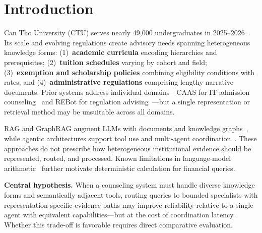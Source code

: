 \section{Introduction}
\label{sec:intro}

Can Tho University (CTU) serves nearly 49,000 undergraduates in 2025--2026~\cite{ctu2025opening}. Its scale and evolving regulations create advisory needs spanning heterogeneous knowledge forms: (1)~\textbf{academic curricula} encoding hierarchies and prerequisites; (2)~\textbf{tuition schedules} varying by cohort and field; (3)~\textbf{exemption and scholarship policies} combining eligibility conditions with rates; and (4)~\textbf{administrative regulations} comprising lengthy narrative documents. Prior systems address individual domains---CAAS for IT admission counseling~\cite{ma2023caas} and REBot for regulation advising~\cite{ma2025rebot}---but a single representation or retrieval method may be unsuitable across all domains.

RAG and GraphRAG augment LLMs with documents and knowledge graphs~\cite{lewis2020rag,gao2023rag_survey,edge2024graphrag}, while agentic architectures support tool use and multi-agent coordination~\cite{yao2023react,wu2023autogen,schick2023toolformer}. These approaches do not prescribe how heterogeneous institutional evidence should be represented, routed, and processed. Known limitations in language-model arithmetic~\cite{qian2023limitations} further motivate deterministic calculation for financial queries.

\textbf{Central hypothesis.}
When a counseling system must handle diverse knowledge forms and semantically adjacent tools, routing queries to bounded specialists with representation-specific evidence paths may improve reliability relative to a single agent with equivalent capabilities---but at the cost of coordination latency. Whether this trade-off is favorable requires direct comparative evaluation.

